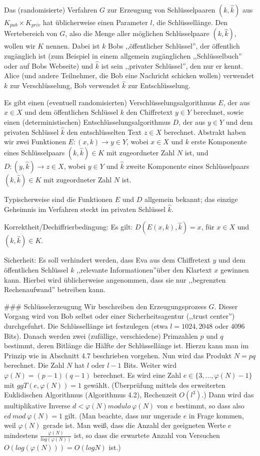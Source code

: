 \documentclass[a4paper]{article}
\begin{document}
\begin{multicols}{3}
{{{Das (randomisierte) Verfahren $G$ zur Erzeugung von Schlüsselpaaren $(k,\hat{k})$ aus $K_{pub} \times K_{priv}$ hat üblicherweise einen Parameter $l$, die Schlüssellänge. Den Wertebereich von $G$, also die Menge aller möglichen Schlüsselpaare $(k,\hat{k})$, wollen wir $K$ nennen. Dabei ist $k$ Bobs ,,öffentlicher Schlüssel'', der öffentlich zugänglich ist (zum Beispiel in einem allgemein zugänglichen ,,Schlüsselbuch'' oder auf Bobs Webseite) und $\hat{k}$ ist sein ,,privater Schlüssel'', den nur er kennt. Alice (und andere Teilnehmer, die Bob eine Nachricht schicken wollen) verwendet $k$ zur Verschlüsselung, Bob verwendet $\hat{k}$ zur Entschlüsselung.

Es gibt einen (eventuell randomisierten) Verschlüsselungsalgorithmus $E$, der aus $x\in X$ und dem öffentlichen Schlüssel $k$ den Chiffretext $y\in Y$ berechnet, sowie einen (deterministischen) Entschlüsselungsalgorithmus $D$, der aus $y\in Y$ und dem privaten Schlüssel $\hat{k}$ den entschlüsselten Text $z\in X$ berechnet. Abstrakt haben wir zwei Funktionen $E: (x,k)\rightarrow y\in Y$, wobei $x\in X$ und $k$ erste Komponente eines Schlüsselpaars $(k,\hat{k})\in K$ mit zugeordneter Zahl $N$ ist, und $D:(y,\hat{k})\rightarrow z\in X$, wobei $y\in Y$ und $\hat{k}$ zweite Komponente eines Schlüsselpaars $(k,\hat{k})\in K$ mit zugeordneter Zahl $N$ ist.

Typischerweise sind die Funktionen $E$ und $D$ allgemein bekannt; das einzige Geheimnis im Verfahren steckt im privaten Schlüssel $\hat{k}$.

Korrektheit/Dechiffrierbedingung: Es gilt: $D(E(x,k), \hat{k}) =x$, für $x\in X$ und $(k,\hat{k})\in K$.

Sicherheit: Es soll verhindert werden, dass Eva aus dem Chiffretext $y$ und dem öffentlichen Schlüssel $k$ ,,relevante Informationen''über den Klartext $x$ gewinnen kann. Hierbei wird üblicherweise angenommen, dass sie nur ,,begrenzten Rechenaufwand'' betreiben kann.

### Schlüsselerzeugung
Wir beschreiben den Erzeugungsprozess $G$. Dieser Vorgang wird von Bob selbst oder einer Sicherheitsagentur (,,trust center'') durchgefuhrt. Die Schlüssellänge ist festzulegen (etwa $l= 1024, 2048$ oder $4096$ Bits). Danach werden zwei (zufällige, verschiedene) Primzahlen $p$ und $q$ bestimmt, deren Bitlänge die Hälfte der Schlüssellänge ist.
Hierzu kann man im Prinzip wie in Abschnitt 4.7 beschrieben vorgehen. Nun wird das Produkt $N=pq$ berechnet. Die Zahl $N$ hat $l$ oder $l-1$ Bits. Weiter wird $\varphi(N) = (p-1)(q-1)$ berechnet. Es wird eine Zahl $e\in\{3,...,\varphi(N)-1\}$ mit $ggT(e,\varphi(N)) = 1$ gewählt. (Überprüfung mittels des erweiterten Euklidischen Algorithmus (Algorithmus 4.2), Rechenzeit $O(l^3)$.) Dann wird das multiplikative Inverse $d<\varphi(N) modulo\ \varphi(N)$ von $e$ bestimmt, so dass also $ed\ mod\ \varphi(N) = 1$ gilt. (Man beachte, dass nur ungerade $e$ in Frage kommen, weil $\varphi(N)$ gerade ist. Man weiß, dass die Anzahl der geeigneten Werte $e$ mindestens $\frac{\varphi(N)}{log(\varphi(N))}$ ist, so dass die erwartete Anzahl von Versuchen $O(log(\varphi(N)))=O(logN)$ ist.)

}}}
\end{multicols}
\end{document}
